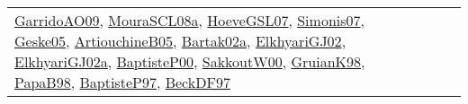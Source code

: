 {\begin{longtable}{lp{3cm}>{\raggedright}p{6cm}>{\raggedright}p{6cm}p{8cm}}
\href{articles/GarridoAO09.pdf}{GarridoAO09}\cite{GarridoAO09}, \href{papers/MouraSCL08a.pdf}{MouraSCL08a}\cite{MouraSCL08a}, \href{papers/HoeveGSL07.pdf}{HoeveGSL07}\cite{HoeveGSL07}, \href{articles/Simonis07.pdf}{Simonis07}\cite{Simonis07}, \href{papers/Geske05.pdf}{Geske05}\cite{Geske05}, \href{papers/ArtiouchineB05.pdf}{ArtiouchineB05}\cite{ArtiouchineB05}, \href{papers/Bartak02a.pdf}{Bartak02a}\cite{Bartak02a}, \href{papers/ElkhyariGJ02.pdf}{ElkhyariGJ02}\cite{ElkhyariGJ02}, \href{papers/ElkhyariGJ02a.pdf}{ElkhyariGJ02a}\cite{ElkhyariGJ02a}, \href{articles/BaptisteP00.pdf}{BaptisteP00}\cite{BaptisteP00}, \href{articles/SakkoutW00.pdf}{SakkoutW00}\cite{SakkoutW00}, \href{papers/GruianK98.pdf}{GruianK98}\cite{GruianK98}, \href{articles/PapaB98.pdf}{PapaB98}\cite{PapaB98}, \href{papers/BaptisteP97.pdf}{BaptisteP97}\cite{BaptisteP97}, \href{papers/BeckDF97.pdf}{BeckDF97}\cite{BeckDF97}\\

\end{longtable}}
